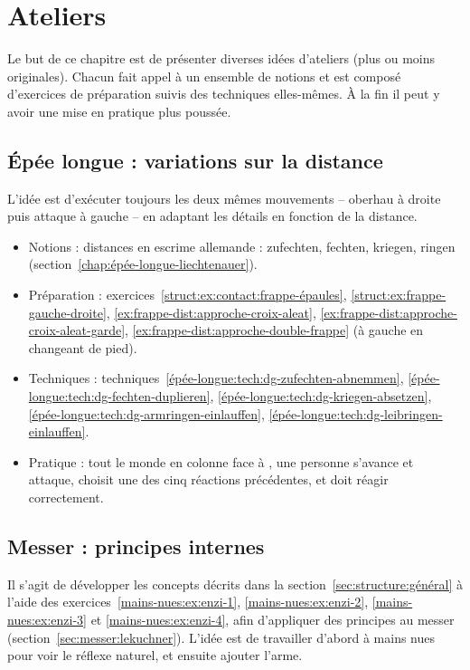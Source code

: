 \section{Ateliers}


Le but de ce chapitre est de présenter diverses idées d'ateliers (plus ou moins originales).
Chacun fait appel à un ensemble de notions et est composé d'exercices de préparation suivis des techniques elles-mêmes.
À la fin il peut y avoir une mise en pratique plus poussée.



\subsection{Épée longue : variations sur la distance}
\label{app:ateliers:épée-longue-variations-distance}


L'idée est d'exécuter toujours les deux mêmes mouvements – oberhau à droite puis attaque à gauche – en adaptant les détails en fonction de la distance.

\begin{itemize}
	\item Notions : distances en escrime allemande : zufechten, fechten, kriegen, ringen (section~\ref{chap:épée-longue-liechtenauer}).
	\item Préparation : exercices~\ref{struct:ex:contact:frappe-épaules}, \ref{struct:ex:frappe-gauche-droite}, \ref{ex:frappe-dist:approche-croix-aleat}, \ref{ex:frappe-dist:approche-croix-aleat-garde}, \ref{ex:frappe-dist:approche-double-frappe} (à gauche en changeant de pied).
	\item Techniques : techniques~\ref{épée-longue:tech:dg-zufechten-abnemmen}, \ref{épée-longue:tech:dg-fechten-duplieren}, \ref{épée-longue:tech:dg-kriegen-absetzen}, \ref{épée-longue:tech:dg-armringen-einlauffen}, \ref{épée-longue:tech:dg-leibringen-einlauffen}.
	\item Pratique : tout le monde en colonne face à \D, une personne \A s'avance et attaque, \D choisit une des cinq réactions précédentes, et \A doit réagir correctement.
\end{itemize}


\subsection{Messer : principes internes}



Il s'agit de développer les concepts décrits dans la section~\ref{sec:structure:général} à l'aide des exercices~\ref{mains-nues:ex:enzi-1}, \ref{mains-nues:ex:enzi-2}, \ref{mains-nues:ex:enzi-3} et \ref{mains-nues:ex:enzi-4}, afin d'appliquer des principes au messer (section~\ref{sec:messer:lekuchner}).
L'idée est de travailler d'abord à mains nues pour voir le réflexe naturel, et ensuite ajouter l'arme.

